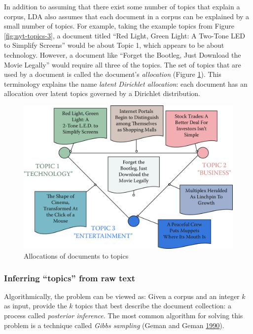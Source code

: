 \documentclass[]{krantz}
\begin{document}
In addition to assuming that there exist some number of topics that
explain a corpus, LDA also assumes that each document in a corpus can be
explained by a small number of topics. For example, taking the example
topics from Figure \ref{fig:nyt-topics-3}, a document titled ``Red
Light, Green Light: A Two-Tone LED to Simplify Screens'' would be about
Topic 1, which appears to be about technology. However, a document like
``Forget the Bootleg, Just Download the Movie Legally'' would require
all three of the topics. The set of topics that are used by a document
is called the document's \emph{allocation} (Figure
\ref{fig:nyt-documents}). This terminology explains the name
\emph{latent Dirichlet allocation}: each document has an allocation over
latent topics governed by a Dirichlet distribution.

\begin{figure}

{\centering \includegraphics[width=0.7\linewidth]{ChapterText/figures/nyt_documents} 

}

\caption{Allocations of documents to topics}\label{fig:nyt-documents}
\end{figure}

\subsubsection{\texorpdfstring{Inferring ``topics'' from raw
text}{Inferring topics from raw text}}\label{inferring-topics-from-raw-text}

Algorithmically, the problem can be viewed as: Given a corpus and an
integer \(k\) as input, provide the \(k\) topics that best describe the
document collection: a process called \emph{posterior inference}. The
most common algorithm for solving this problem is a technique called
\emph{Gibbs sampling} (Geman and Geman
\protect\hyperlink{ref-geman-90}{1990}).
\end{document}
